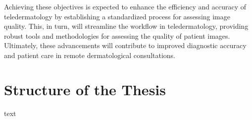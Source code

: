 Achieving these objectives is expected to enhance the efficiency and accuracy of teledermatology by establishing a standardized process for assessing image quality. This, in turn, will streamline the workflow in teledermatology, providing robust tools and methodologies for assessing the quality of patient images. Ultimately, these advancements will contribute to improved diagnostic accuracy and patient care in remote dermatological consultations. \par

\section{Structure of the Thesis}
\label{sec:Structure}
text \par
\vspace{\baselineskip}
\noindent
